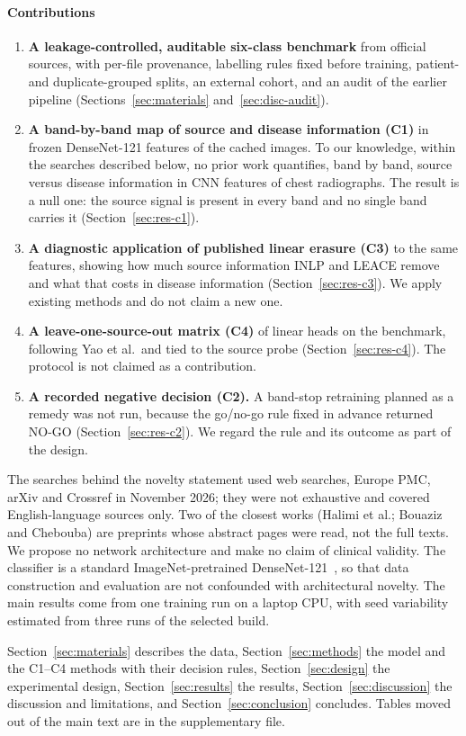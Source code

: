 \paragraph{Contributions}
\begin{enumerate}
\item \textbf{A leakage-controlled, auditable six-class benchmark} from official sources, with per-file provenance, labelling rules fixed before training, patient- and duplicate-grouped splits, an external cohort, and an audit of the earlier pipeline (Sections~\ref{sec:materials} and~\ref{sec:disc-audit}).
\item \textbf{A band-by-band map of source and disease information (C1)} in frozen DenseNet-121 features of the cached images. To our knowledge, within the searches described below, no prior work quantifies, band by band, source versus disease information in CNN features of chest radiographs. The result is a null one: the source signal is present in every band and no single band carries it (Section~\ref{sec:res-c1}).
\item \textbf{A diagnostic application of published linear erasure (C3)} to the same features, showing how much source information INLP and LEACE remove and what that costs in disease information (Section~\ref{sec:res-c3}). We apply existing methods and do not claim a new one.
\item \textbf{A leave-one-source-out matrix (C4)} of linear heads on the benchmark, following Yao et al.\ and tied to the source probe (Section~\ref{sec:res-c4}). The protocol is not claimed as a contribution.
\item \textbf{A recorded negative decision (C2).} A band-stop retraining planned as a remedy was not run, because the go/no-go rule fixed in advance returned NO-GO (Section~\ref{sec:res-c2}). We regard the rule and its outcome as part of the design.
\end{enumerate}

The searches behind the novelty statement used web searches, Europe PMC, arXiv and Crossref in November 2026; they were not exhaustive and covered English-language sources only. Two of the closest works (Halimi et al.; Bouaziz and Chebouba) are preprints whose abstract pages were read, not the full texts. We propose no network architecture and make no claim of clinical validity. The classifier is a standard ImageNet-pretrained DenseNet-121~\cite{huang2017densely,deng2009imagenet}, so that data construction and evaluation are not confounded with architectural novelty. The main results come from one training run on a laptop CPU, with seed variability estimated from three runs of the selected build.

Section~\ref{sec:materials} describes the data, Section~\ref{sec:methods} the model and the C1--C4 methods with their decision rules, Section~\ref{sec:design} the experimental design, Section~\ref{sec:results} the results, Section~\ref{sec:discussion} the discussion and limitations, and Section~\ref{sec:conclusion} concludes. Tables moved out of the main text are in the supplementary file.
